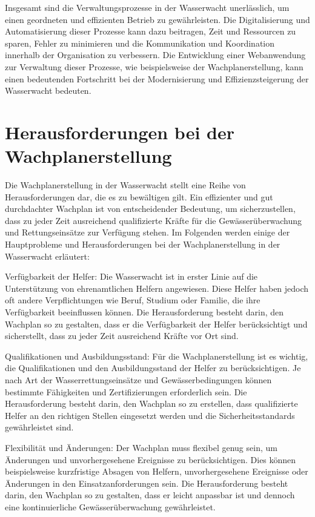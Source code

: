 \documentclass[fontsize=12pt,openright,oneside,paper=a4,BCOR=1cm]{scrbook}
\begin{document}
Insgesamt sind die Verwaltungsprozesse in der Wasserwacht unerlässlich, um einen geordneten und effizienten Betrieb zu gewährleisten. Die Digitalisierung und Automatisierung dieser Prozesse kann dazu beitragen, Zeit und Ressourcen zu sparen, Fehler zu minimieren und die Kommunikation und Koordination innerhalb der Organisation zu verbessern. Die Entwicklung einer Webanwendung zur Verwaltung dieser Prozesse, wie beispielsweise der Wachplanerstellung, kann einen bedeutenden Fortschritt bei der Modernisierung und Effizienzsteigerung der Wasserwacht bedeuten.

\section{Herausforderungen bei der Wachplanerstellung}

Die Wachplanerstellung in der Wasserwacht stellt eine Reihe von Herausforderungen dar, die es zu bewältigen gilt. Ein effizienter und gut durchdachter Wachplan ist von entscheidender Bedeutung, um sicherzustellen, dass zu jeder Zeit ausreichend qualifizierte Kräfte für die Gewässerüberwachung und Rettungseinsätze zur Verfügung stehen. Im Folgenden werden einige der Hauptprobleme und Herausforderungen bei der Wachplanerstellung in der Wasserwacht erläutert:

    Verfügbarkeit der Helfer: Die Wasserwacht ist in erster Linie auf die Unterstützung von ehrenamtlichen Helfern angewiesen. Diese Helfer haben jedoch oft andere Verpflichtungen wie Beruf, Studium oder Familie, die ihre Verfügbarkeit beeinflussen können. Die Herausforderung besteht darin, den Wachplan so zu gestalten, dass er die Verfügbarkeit der Helfer berücksichtigt und sicherstellt, dass zu jeder Zeit ausreichend Kräfte vor Ort sind.

    Qualifikationen und Ausbildungsstand: Für die Wachplanerstellung ist es wichtig, die Qualifikationen und den Ausbildungsstand der Helfer zu berücksichtigen. Je nach Art der Wasserrettungseinsätze und Gewässerbedingungen können bestimmte Fähigkeiten und Zertifizierungen erforderlich sein. Die Herausforderung besteht darin, den Wachplan so zu erstellen, dass qualifizierte Helfer an den richtigen Stellen eingesetzt werden und die Sicherheitsstandards gewährleistet sind.

    Flexibilität und Änderungen: Der Wachplan muss flexibel genug sein, um Änderungen und unvorhergesehene Ereignisse zu berücksichtigen. Dies können beispielsweise kurzfristige Absagen von Helfern, unvorhergesehene Ereignisse oder Änderungen in den Einsatzanforderungen sein. Die Herausforderung besteht darin, den Wachplan so zu gestalten, dass er leicht anpassbar ist und dennoch eine kontinuierliche Gewässerüberwachung gewährleistet.
\end{document}
